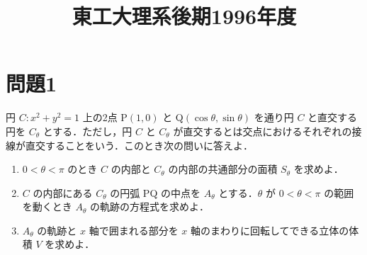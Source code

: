 \documentclass[unicode,12pt, a4paper]{ltjsarticle}%
\title{東工大理系後期1996年度}
\begin{document}
\maketitle
\section{問題1}
円 $C: x^2+y^2=1$ 上の2点 P$(1,0)$ と Q$(\cos\theta, \sin\theta)$ を通り円 $C$ と直交する円を $C_\theta$ とする．ただし，円 $C$ と $C_\theta$ が直交するとは交点におけるそれぞれの接線が直交することをいう．このとき次の問いに答えよ．

\begin{enumerate}
    \item $0 < \theta < \pi$ のとき $C$ の内部と $C_\theta$ の内部の共通部分の面積 $S_\theta$ を求めよ．
    \item $C$ の内部にある $C_\theta$ の円弧 PQ の中点を $A_\theta$ とする．$\theta$ が $0 < \theta < \pi$ の範囲を動くとき $A_\theta$ の軌跡の方程式を求めよ．
    \item $A_\theta$ の軌跡と $x$ 軸で囲まれる部分を $x$ 軸のまわりに回転してできる立体の体積 $V$ を求めよ．
\end{enumerate}
\end{document}
